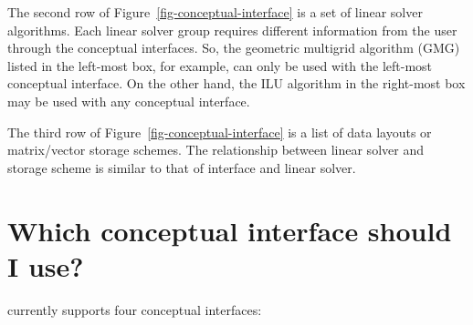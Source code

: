 The second row of Figure~\ref{fig-conceptual-interface} is a set of
linear solver algorithms.  Each linear solver group requires different
information from the user through the conceptual interfaces.  So, the
geometric multigrid algorithm (GMG) listed in the left-most box, for
example, can only be used with the left-most conceptual interface.  On
the other hand, the ILU algorithm in the right-most box may be used
with any conceptual interface.

The third row of Figure~\ref{fig-conceptual-interface} is a list of
data layouts or matrix/vector storage schemes.  The relationship
between linear solver and storage scheme is similar to that of
interface and linear solver.


\section{Which conceptual interface should I use?}
\label{sec-Which-conceptual-interface}

\hypre{} currently supports four conceptual interfaces:

